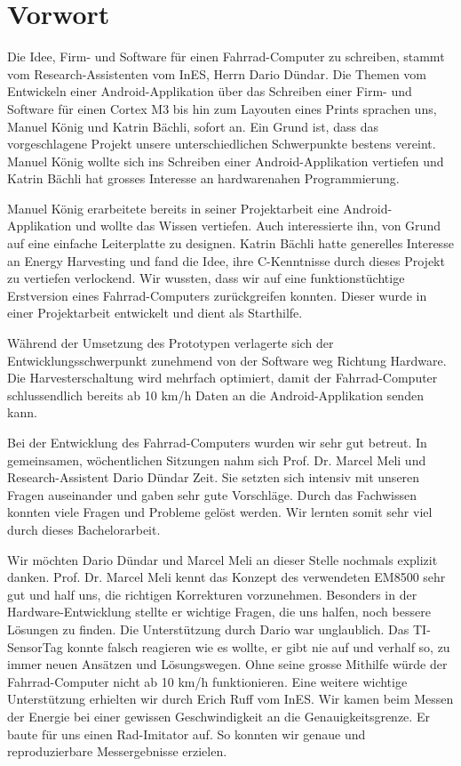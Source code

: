 \chapter*{Vorwort}

Die Idee, Firm- und Software für einen Fahrrad-Computer zu schreiben, stammt vom Research-Assistenten vom InES, Herrn Dario Dündar. Die Themen vom Entwickeln einer Android-Applikation über das Schreiben einer Firm- und Software für einen Cortex M3 bis hin zum Layouten eines Prints sprachen uns, Manuel König und Katrin Bächli, sofort an. Ein Grund ist, dass das vorgeschlagene Projekt unsere unterschiedlichen Schwerpunkte bestens vereint. 
Manuel König wollte sich ins Schreiben einer Android-Applikation vertiefen und Katrin Bächli hat grosses Interesse an hardwarenahen Programmierung.  

Manuel König erarbeitete bereits in seiner Projektarbeit eine Android-Applikation und wollte das Wissen vertiefen. Auch interessierte ihn, von Grund auf eine einfache Leiterplatte zu designen. Katrin Bächli hatte generelles Interesse an Energy Harvesting und fand die Idee, ihre C-Kenntnisse durch dieses Projekt zu vertiefen verlockend. Wir wussten, dass wir auf eine funktionstüchtige Erstversion eines Fahrrad-Computers zurückgreifen konnten. Dieser wurde in einer Projektarbeit entwickelt und dient als Starthilfe.

Während der Umsetzung des Prototypen verlagerte sich der Entwicklungsschwerpunkt zunehmend von der Software weg Richtung Hardware. Die Harvesterschaltung wird mehrfach optimiert, damit der Fahrrad-Computer schlussendlich bereits ab 10 km/h Daten an die Android-Applikation senden kann.

Bei der Entwicklung des Fahrrad-Computers wurden wir sehr gut betreut. In gemeinsamen, wöchentlichen Sitzungen nahm sich Prof. Dr. Marcel Meli und Research-Assistent Dario Dündar Zeit. Sie setzten sich intensiv mit unseren Fragen auseinander und gaben sehr gute Vorschläge. Durch das Fachwissen konnten viele Fragen und Probleme gelöst werden. Wir lernten somit sehr viel durch dieses Bachelorarbeit. 

Wir möchten Dario Dündar und Marcel Meli an dieser Stelle nochmals explizit danken. Prof. Dr. Marcel Meli kennt das Konzept des verwendeten EM8500 sehr gut und half uns, die richtigen Korrekturen vorzunehmen. Besonders in der Hardware-Entwicklung stellte er wichtige Fragen, die uns halfen, noch bessere Lösungen zu finden. Die Unterstützung durch Dario war unglaublich. Das TI-SensorTag konnte falsch reagieren wie es wollte, er gibt nie auf und verhalf so, zu immer neuen Ansätzen und Lösungswegen. Ohne seine grosse Mithilfe würde der Fahrrad-Computer nicht ab 10 km/h funktionieren. Eine weitere wichtige Unterstützung erhielten wir durch Erich Ruff vom InES. Wir kamen beim Messen der Energie bei einer gewissen Geschwindigkeit an die Genauigkeitsgrenze. Er baute für uns einen Rad-Imitator auf. So konnten wir genaue und reproduzierbare Messergebnisse erzielen. 


